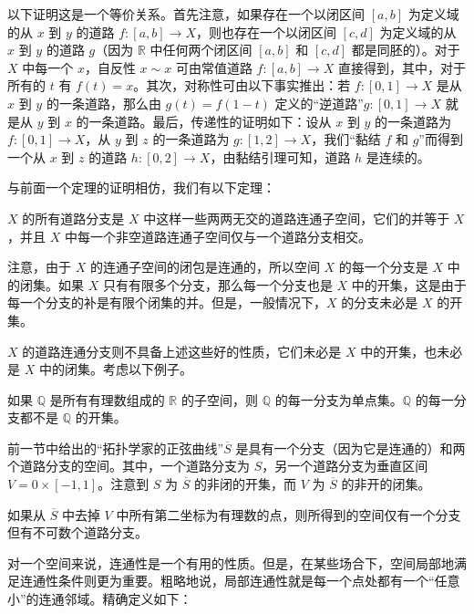 以下证明这是一个等价关系。首先注意，如果存在一个以闭区间 $[a,b]$ 为定义域的从 $x$ 到 $y$ 的道路 $f\colon[a,b]\to X$，则也存在一个以闭区间 $[c,d]$ 为定义域的从 $x$ 到 $y$ 的道路 $g$（因为 $\mathbb{R}$ 中任何两个闭区间 $[a,b]$ 和 $[c,d]$ 都是同胚的）。对于 $X$ 中每一个 $x$，自反性 $x\sim x$ 可由常值道路 $f\colon[a,b]\to X$ 直接得到，其中，对于所有的 $t$ 有 $f(t)=x$。其次，对称性可由以下事实推出：若 $f\colon[0,1]\to X$ 是从 $x$ 到 $y$ 的一条道路，那么由 $g(t)=f(1-t)$ 定义的``逆道路''$g\colon[0,1]\to X$ 就是从 $y$ 到 $x$ 的一条道路。最后，传递性的证明如下：设从 $x$ 到 $y$ 的一条道路为 $f\colon[0,1]\to X$，从 $y$ 到 $z$ 的一条道路为 $g\colon[1,2]\to X$，我们``黏结 $f$ 和 $g$''而得到一个从 $x$ 到 $z$ 的道路 $h\colon[0,2]\to X$，由黏结引理可知，道路 $h$ 是连续的。

与前面一个定理的证明相仿，我们有以下定理：

\begin{theorem}\label{theorem:ch03-path-components-partition}
$X$ 的所有道路分支是 $X$ 中这样一些两两无交的道路连通子空间，它们的并等于 $X$，并且 $X$ 中每一个非空道路连通子空间仅与一个道路分支相交。
\end{theorem}

注意，由于 $X$ 的连通子空间的闭包是连通的，所以空间 $X$ 的每一个分支是 $X$ 中的闭集。如果 $X$ 只有有限多个分支，那么每一个分支也是 $X$ 中的开集，这是由于每一个分支的补是有限个闭集的并。但是，一般情况下，$X$ 的分支未必是 $X$ 的开集。

$X$ 的道路连通分支则不具备上述这些好的性质，它们未必是 $X$ 中的开集，也未必是 $X$ 中的闭集。考虑以下例子。

\begin{example}\label{example:ch03-q-components}
如果 $\mathbb{Q}$ 是所有有理数组成的 $\mathbb{R}$ 的子空间，则 $\mathbb{Q}$ 的每一分支为单点集。$\mathbb{Q}$ 的每一分支都不是 $\mathbb{Q}$ 的开集。
\end{example}

\begin{example}\label{example:ch03-sine-components}
前一节中给出的``拓扑学家的正弦曲线''$\overline{S}$ 是具有一个分支（因为它是连通的）和两个道路分支的空间。其中，一个道路分支为 $S$，另一个道路分支为垂直区间 $V=0\times[-1,1]$。注意到 $S$ 为 $\overline{S}$ 的非闭的开集，而 $V$ 为 $\overline{S}$ 的非开的闭集。

如果从 $\overline{S}$ 中去掉 $V$ 中所有第二坐标为有理数的点，则所得到的空间仅有一个分支但有不可数个道路分支。
\end{example}

对一个空间来说，连通性是一个有用的性质。但是，在某些场合下，空间局部地满足连通性条件则更为重要。粗略地说，局部连通性就是每一个点处都有一个``任意小''的连通邻域。精确定义如下：


